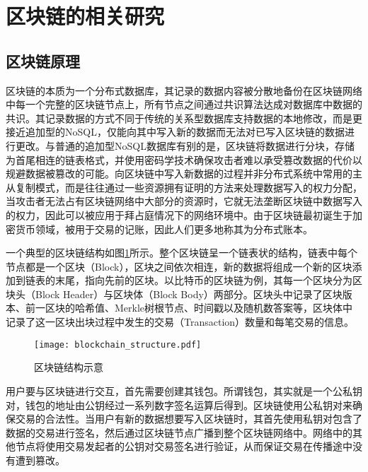   \section{区块链的相关研究}
  \label{survey:blockchain}

    \subsection{区块链原理}
    \label{survey:blockchain:theory}
    区块链的本质为一个分布式数据库，其记录的数据内容被分散地备份在区块链网络中每一个完整的区块链节点上，所有节点之间通过共识算法达成对数据库中数据的共识。其记录数据的方式不同于传统的关系型数据库支持数据的本地修改，而是更接近追加型的NoSQL，仅能向其中写入新的数据而无法对已写入区块链的数据进行更改。与普通的追加型NoSQL数据库有别的是，区块链将数据进行分块，存储为首尾相连的链表格式，并使用密码学技术确保攻击者难以承受篡改数据的代价以规避数据被篡改的可能。向区块链中写入新数据的过程并非分布式系统中常用的主从复制模式，而是往往通过一些资源拥有证明的方法来处理数据写入的权力分配，当攻击者无法占有区块链网络中大部分的资源时，它就无法垄断区块链中数据写入的权力，因此可以被应用于拜占庭情况下的网络环境中。由于区块链最初诞生于加密货币领域，被用于交易的记账，因此人们更多地称其为分布式账本。

    一个典型的区块链结构如图\ref{fig:blockchain_structure}所示。整个区块链呈一个链表状的结构，链表中每个节点都是一个区块（Block），区块之间依次相连，新的数据将组成一个新的区块添加到链表的末尾，指向先前的区块。以比特币的区块链为例，其每一个区块分为区块头（Block Header）与区块体（Block Body）两部分。区块头中记录了区块版本、前一区块的哈希值、Merkle树\cite{merkle1987digital}根节点、时间戳以及随机数答案等，区块体中记录了这一区块出块过程中发生的交易（Transaction）数量和每笔交易的信息。

    \begin{figure}[ht]
      \centering
      \texttt{[image: blockchain\_structure.pdf]}
      \caption{区块链结构示意}
      \label{fig:blockchain_structure}
    \end{figure}

    用户要与区块链进行交互，首先需要创建其钱包。所谓钱包，其实就是一个公私钥对，钱包的地址由公钥经过一系列数字签名运算后得到。区块链使用公私钥对来确保交易的合法性。当用户有新的数据想要写入区块链时，其首先使用私钥对包含了数据的交易进行签名，然后通过区块链节点广播到整个区块链网络中。网络中的其他节点将使用交易发起者的公钥对交易签名进行验证，从而保证交易在传播途中没有遭到篡改。

